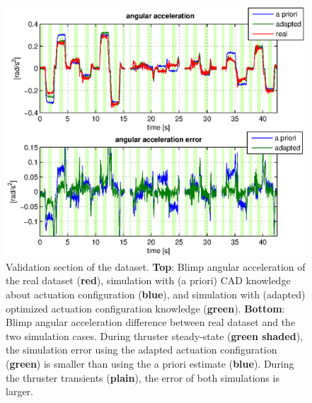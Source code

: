 \begin{figure}[hbtp]
\captionsetup{width=0.9\textwidth}
\centering
\includegraphics[scale=0.8]{images/results/compare_alpha_x.eps}
\caption{Validation section of the dataset. \textbf{Top}: Blimp angular acceleration of the real dataset (\textbf{red}), simulation with (a priori) CAD knowledge about actuation configuration (\textbf{blue}), and simulation with (adapted) optimized actuation configuration knowledge (\textbf{green}).
\textbf{Bottom}: Blimp angular acceleration difference between real dataset and the two simulation cases.
During thruster steady-state (\textbf{green shaded}), the simulation error using the adapted actuation configuration (\textbf{green}) is smaller than using the a priori estimate (\textbf{blue}).
During the thruster transients (\textbf{plain}), the error of both simulations is larger.
}
\label{fig:result_sim_improve_and_error}
\end{figure}

